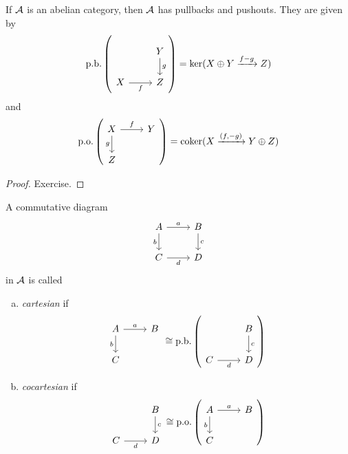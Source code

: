 \documentclass[a4paper]{report}
\begin{document}
\begin{prop}
  If $\mathcal{A}$ is an abelian category, then $\mathcal{A}$ has pullbacks and pushouts. They are given by
  \[\mathrm{p.b.}\l( \begin{tikzcd}
                  & Y \arrow[d, "g"] \\
X \arrow[r, "f"'] & Z
\end{tikzcd}\r) = \ker (X \opl Y \tto{f - g} Z)\]
and
\[\mathrm{p.o.}\l(  \begin{tikzcd}
X \arrow[d, "g"'] \arrow[r, "f"] & Y \\
Z                                &
\end{tikzcd} \r) = \coker(X \tto {(f,-g)} Y \opl Z)\]
\begin{proof}
Exercise.
\end{proof}
\end{prop}

\begin{defi}
A commutative diagram \[\begin{tikzcd}
A \arrow[r, "a"] \arrow[d, "b"'] & B \arrow[d, "c"] \\
C \arrow[r, "d"']                & D
\end{tikzcd}\] in $\mathcal{A}$ is called
\begin{enumerate}[(a)]
  \item \emph{cartesian} if
        \[\begin{tikzcd}
            A \arrow[d, "b"'] \arrow[r, "a"] & B \\
            C
          \end{tikzcd} \cong \mathrm{p.b.} \l( \begin{tikzcd}
            & B \arrow[d, "c"] \\
            C \arrow[r, "d"'] & D
          \end{tikzcd} \r)\]
  \item \emph{cocartesian} if
        \[\begin{tikzcd}
            & B \arrow[d, "c"] \\
            C \arrow[r, "d"'] & D
          \end{tikzcd} \cong \mathrm{p.o.} \l( \begin{tikzcd}
            A \arrow[d, "b"'] \arrow[r, "a"] & B \\
            C
          \end{tikzcd} \r) \]
\end{enumerate}
\end{defi}
\end{document}
